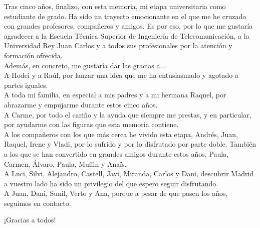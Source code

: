 

Tras cinco años, finalizo, con esta memoria, mi etapa universitaria como estudiante de grado. Ha sido un trayecto emocionante en el que me he cruzado con grandes profesores, compañeros y amigos. %
Es por eso, por lo que me gustaría agradecer a la Escuela Técnica Superior de Ingeniería de Telecomunicación, a la Universidad Rey Juan Carlos y a todos sus profesionales por la atención y formación ofrecida. \\
Además, en concreto, me gustaría dar las gracias a... \\


A Hodei y a Raúl, por lanzar una idea que me ha entusiasmado y agotado a partes iguales. \\

A toda mi familia, en especial a mis padres y a mi hermana Raquel, por abrazarme y empujarme durante estos cinco años. \\

A Carme, por todo el cariño y la ayuda que siempre me prestas, y en particular, por ayudarme con las figuras que esta memoria contiene. \\

A los compañeros con los que más cerca he vivido esta etapa, Andrés, Juan, Raquel, Irene y Vladi, por lo sufrido y por lo disfrutado por parte doble. También a los que se han convertido en grandes amigos durante estos años, Paula, Carmen, Álvaro, Paula, Muffin y Anaïs. \\

A Luci, Silvi, Alejandro, Castell, Javi, Miranda, Carlos y Dani, descubrir Madrid a vuestro lado ha sido un privilegio del que espero seguir disfrutando. \\

A Juan, Dani, Sunil, Verto y Ana, porque a pesar de que pasen los años, seguimos en contacto. \\

\begin{center}
    ¡Gracias a todos!
\end{center}